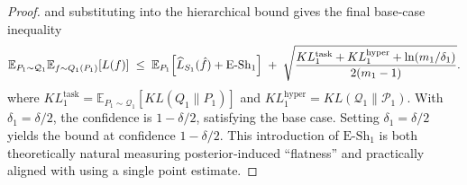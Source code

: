 \documentclass[letterpaper]{article} %
\begin{document}
\begin{proof}
and substituting into the hierarchical bound gives the final base‐case inequality
\[
\mathbb{E}_{P_1\sim\mathcal Q_1}\mathbb{E}_{f\sim Q_1(P_1)}[L(f)]
\;\le\;
\mathbb{E}_{P_1}\Bigl[\widehat L_{S_1}(\hat f) + \mathrm{E\text{-}Sh}_1\Bigr]
\;+\;
\sqrt{\frac{KL^{\mathrm{task}}_1 + KL^{\mathrm{hyper}}_1 + \ln(m_1/\delta_1)}{2(m_1-1)}}.
\]
 where $KL^{\text{task}}_1 = \mathbb{E}_{P_1 \sim \mathcal{Q}_1}[KL(Q_1\|P_1)]$ and $KL^{\text{hyper}}_1 = KL(\mathcal{Q}_1\|\mathcal{P}_1)$. With $\delta_1 = \delta/2$, the confidence is $1-\delta/2$, satisfying the base case.
Setting $\delta_1=\delta/2$ yields the bound at confidence $1-\delta/2$.  This introduction of $\mathrm{E\text{-}Sh}_1$ is both theoretically natural measuring posterior‐induced “flatness” and practically aligned with using a single point estimate.  




















\end{proof}
\end{document}
